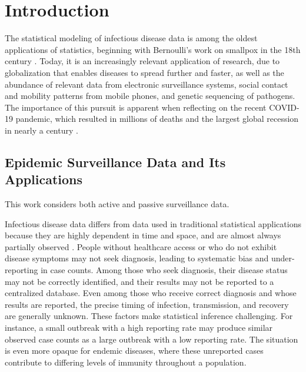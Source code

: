 \chapter{Introduction}
\label{ch:introduction}
\graphicspath{{figures/ch_1/}}

The statistical modeling of infectious disease data is among the oldest applications of statistics, beginning with Bernoulli's work on smallpox in the 18th century \citep{Bernoulli2004}.
Today, it is an increasingly relevant application of research, due to globalization that enables diseases to spread further and faster, as well as the abundance of relevant data from electronic surveillance systems, social contact and mobility patterns from mobile phones, and genetic sequencing of pathogens.
The importance of this pursuit is apparent when reflecting on the recent COVID-19 pandemic, which resulted in millions of deaths and the largest global recession in nearly a century \citep{whocoronavirus,  zumbrun_2020}.

\section{Epidemic Surveillance Data and Its Applications}
\label{sec:epidemic_surveillance_data}
This work considers both active and passive surveillance data.

Infectious disease data differs from data used in traditional statistical applications because they are highly dependent in time and space, and are almost always partially observed \citep{held2019handbook}.
People without healthcare access or who do not exhibit disease symptoms may not seek diagnosis, leading to systematic bias and under-reporting in case counts.
Among those who seek diagnosis, their disease status may not be correctly identified, and their results may not be reported to a centralized database.
Even among those who receive correct diagnosis and whose results are reported, the precise timing of infection, transmission, and recovery are generally unknown.
These factors make statistical inference challenging.
For instance, a small outbreak with a high reporting rate may produce similar observed case counts as a large outbreak with a low reporting rate.
The situation is even more opaque for endemic diseases, where these unreported cases contribute to differing levels of immunity throughout a population.

